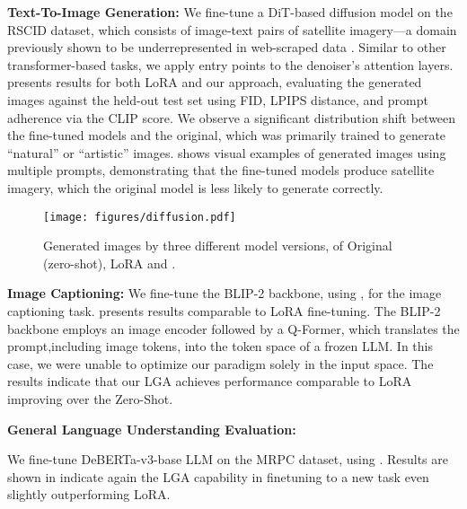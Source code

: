 
{\bf Text-To-Image Generation:} We fine-tune a DiT-based diffusion model \cite{pixart-alpha} on the RSCID \cite{rscid} dataset, which consists of image-text pairs of satellite imagery—a domain previously shown to be underrepresented in web-scraped data \cite{clip}. Similar to other transformer-based tasks, we apply \oursp entry points to the denoiser's attention layers.  presents results for both LoRA and our \oursp approach, evaluating the generated images against the held-out test set using FID, LPIPS distance, and prompt adherence via the CLIP score. We observe a significant distribution shift between the fine-tuned models and the original, which was primarily trained to generate ``natural'' or ``artistic'' images.  shows visual examples of generated images using multiple prompts, demonstrating that the fine-tuned models produce satellite imagery, which the original model is less likely to generate correctly.

\begin{figure*}[ht]
	\centering
	\texttt{[image: figures/diffusion.pdf]}
	\caption{Generated images by three different model versions, of Original (zero-shot), LoRA and \oursp.}
	\label{fig:diffusion}
\end{figure*}

{\bf Image Captioning:}
We fine-tune the BLIP-2 \cite{BLIP2} backbone, using \oursp, for the image captioning task.  presents results comparable to LoRA fine-tuning. The BLIP-2 backbone employs an image encoder followed by a Q-Former, which translates the prompt,including image tokens, into the token space of a frozen LLM. In this case, we were unable to optimize our \ours paradigm solely in the input space. The results indicate that our LGA achieves performance comparable to LoRA improving over the Zero-Shot.



{\bf General Language Understanding Evaluation:}

We fine-tune DeBERTa-v3-base LLM on the MRPC dataset, using \oursp. Results are shown in  indicate again the LGA capability in finetuning to a new task even slightly outperforming LoRA.

